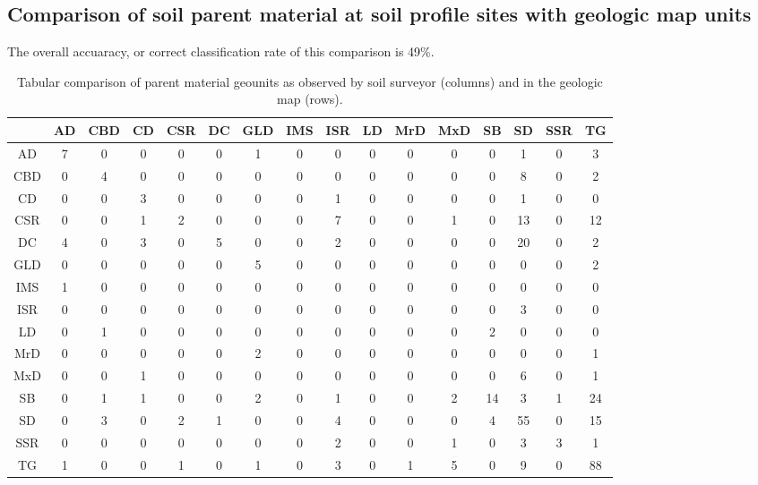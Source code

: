 \documentclass[preprint,12pt,authoryear]{elsarticle}
\begin{document}
\subsection{Comparison of soil parent material at soil profile sites with geologic map units}
The overall accuaracy, or correct classification rate of this comparison is 49\%.
\begin{table}[ht]
\centering
\tabcolsep=0.06cm
\begin{tabular}{c|ccccccccccccccc}
 & AD & CBD & CD & CSR & DC & GLD & IMS & ISR & LD & MrD & MxD & SB & SD & SSR & TG \\ 
  \hline
AD &   7 &   0 &   0 &   0 &   0 &   1 &   0 &   0 &   0 &   0 &   0 &   0 &   1 &   0 &   3 \\ 
  CBD &   0 &   4 &   0 &   0 &   0 &   0 &   0 &   0 &   0 &   0 &   0 &   0 &   8 &   0 &   2 \\ 
  CD &   0 &   0 &   3 &   0 &   0 &   0 &   0 &   1 &   0 &   0 &   0 &   0 &   1 &   0 &   0 \\ 
  CSR &   0 &   0 &   1 &   2 &   0 &   0 &   0 &   7 &   0 &   0 &   1 &   0 &  13 &   0 &  12 \\ 
  DC &   4 &   0 &   3 &   0 &   5 &   0 &   0 &   2 &   0 &   0 &   0 &   0 &  20 &   0 &   2 \\ 
  GLD &   0 &   0 &   0 &   0 &   0 &   5 &   0 &   0 &   0 &   0 &   0 &   0 &   0 &   0 &   2 \\ 
  IMS &   1 &   0 &   0 &   0 &   0 &   0 &   0 &   0 &   0 &   0 &   0 &   0 &   0 &   0 &   0 \\ 
  ISR &   0 &   0 &   0 &   0 &   0 &   0 &   0 &   0 &   0 &   0 &   0 &   0 &   3 &   0 &   0 \\ 
  LD &   0 &   1 &   0 &   0 &   0 &   0 &   0 &   0 &   0 &   0 &   0 &   2 &   0 &   0 &   0 \\ 
  MrD &   0 &   0 &   0 &   0 &   0 &   2 &   0 &   0 &   0 &   0 &   0 &   0 &   0 &   0 &   1 \\ 
  MxD &   0 &   0 &   1 &   0 &   0 &   0 &   0 &   0 &   0 &   0 &   0 &   0 &   6 &   0 &   1 \\ 
  SB &   0 &   1 &   1 &   0 &   0 &   2 &   0 &   1 &   0 &   0 &   2 &  14 &   3 &   1 &  24 \\ 
  SD &   0 &   3 &   0 &   2 &   1 &   0 &   0 &   4 &   0 &   0 &   0 &   4 &  55 &   0 &  15 \\ 
  SSR &   0 &   0 &   0 &   0 &   0 &   0 &   0 &   2 &   0 &   0 &   1 &   0 &   3 &   3 &   1 \\ 
  TG &   1 &   0 &   0 &   1 &   0 &   1 &   0 &   3 &   0 &   1 &   5 &   0 &   9 &   0 &  88 \\ 
   \hline
\end{tabular}
\caption{Tabular comparison of parent material geounits as observed by soil surveyor (columns) and in the geologic map (rows).} 
\label{kartiergegenkarte}
\end{table}
\end{document}
